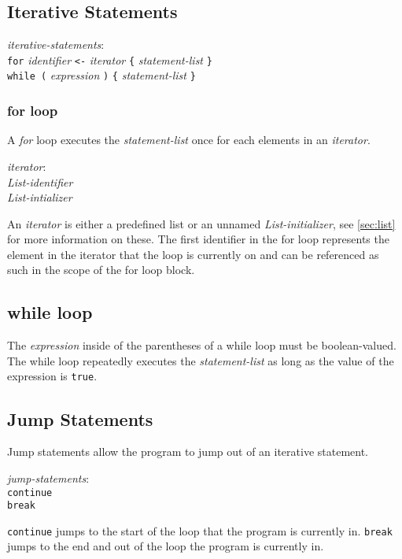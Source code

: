 \documentclass{article}
\begin{document}
\subsection{Iterative Statements}

\begin{tabbing}
	\= \emph{iter}\=\emph{ative-statements}: \\
	\> \> \texttt{for} \emph{identifier} \texttt{<-} \emph{iterator} \texttt{\{} \emph{statement-list} \texttt{\}} \\
	\> \> \texttt{while (} \emph{expression} \texttt{)} \texttt{\{} \emph{statement-list} \texttt{\}}
\end{tabbing}

\subsubsection{for loop}

A \emph{for} loop executes the \emph{statement-list} once for each elements in an \emph{iterator}.

\begin{tabbing}
\= \emph{iter}\=\emph{ator}:\\
\>\> \emph{List-identifier} \\
\>\> \emph{List-intializer}
\end{tabbing}

An \emph{iterator} is either a predefined list or an unnamed \emph{List-initializer}, see \ref{sec:list} for more information on these. The first identifier in the for loop represents the element in the iterator that the loop is currently on and can be referenced as such in the scope of the for loop block.

\subsection{while loop}

The \emph{expression} inside of the parentheses of a while loop must be boolean-valued. The while loop repeatedly executes the \emph{statement-list} as long as the value of the expression is \texttt{true}.

\subsection{Jump Statements}
Jump statements allow the program to jump out of an iterative statement.

\begin{tabbing}
	\= \emph{jump}\=\emph{-statements}: \\
	\> \> \texttt{continue} \\
	\> \> \texttt{break}
\end{tabbing}
\texttt{continue} jumps to the start of the loop that the program is currently in. \texttt{break} jumps to the end and out of the loop the program is currently in.
\end{document}
